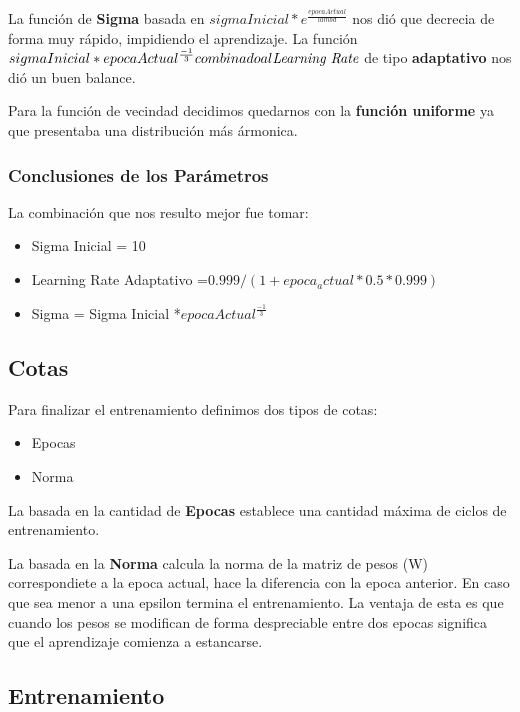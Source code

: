 La función de \textbf{Sigma} basada en $sigmaInicial * e^\frac{epocaActual}{lambd}$
nos dió que decrecia de forma muy rápido, impidiendo el aprendizaje.
La función $sigmaInicial * {epocaActual^\frac{-1}{3}} combinado al \emph{Learning Rate}$
de tipo \textbf{adaptativo} nos dió un buen balance.

Para la función de vecindad decidimos quedarnos con la \textbf{función uniforme} ya
que presentaba una distribución más ármonica.

\subsubsection{Conclusiones de los Parámetros}

La combinación que nos resulto mejor fue tomar:


\begin{itemize}
	\item Sigma Inicial = 10
	\item Learning Rate Adaptativo =$ 0.999 / (1 + epoca_actual * 0.5 * 0.999)$
	\item Sigma = Sigma Inicial *$ {epocaActual^\frac{-1}{3}}$
\end{itemize}


\subsection{Cotas}

Para finalizar el entrenamiento definimos dos tipos de cotas:

\begin{itemize}
	\item Epocas
	\item Norma
\end{itemize}

La basada en la cantidad de \textbf{Epocas} establece una cantidad máxima de
ciclos de entrenamiento.

La basada en la \textbf{Norma} calcula la norma de la matriz de pesos (W) 
correspondiete a la epoca actual, hace la diferencia con la epoca anterior.
En caso que sea menor a una epsilon termina el entrenamiento. La ventaja
de esta es que cuando los pesos se modifican de forma despreciable entre
dos epocas significa que el aprendizaje comienza a estancarse.


\subsection{Entrenamiento}

